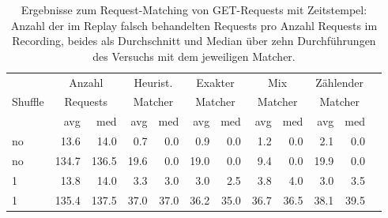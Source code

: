 \documentclass[12pt,a4paper]{report}
\begin{document}
\begin{table}[H]
	\centering
	\caption{
		Ergebnisse zum Request-Matching von GET-Requests mit Zeitstempel:
		Anzahl der im Replay falsch behandelten Requests pro Anzahl Requests im Recording,
		beides als Durchschnitt und Median über zehn Durchführungen des Versuchs mit dem jeweiligen Matcher.
	}
	\label{tab:get_ts}
	\begin{tabular}{|l|r|r|r|r|r|r|r|r|r|r|r|}
		\hline
		\multirow{3}{*}{Shuffle} & \multicolumn{2}{|c|}{Anzahl}   & \multicolumn{2}{|c|}{Heurist.} & \multicolumn{2}{|c|}{Exakter} & \multicolumn{2}{|c|}{Mix}     & \multicolumn{2}{|c|}{Zählender}                                    \\
		                         & \multicolumn{2}{|c|}{Requests} & \multicolumn{2}{|c|}{Matcher}  & \multicolumn{2}{|c|}{Matcher} & \multicolumn{2}{|c|}{Matcher} & \multicolumn{2}{|c|}{Matcher}                                      \\ \cline{2-11}
		                         & avg                            & med                            & avg                           & med                           & avg                             & med  & avg  & med  & avg  & med  \\ \hline
		no                       & 13.6                           & 14.0                           & 0.7                           & 0.0                           & 0.9                             & 0.0  & 1.2  & 0.0  & 2.1  & 0.0  \\ \hline
		no                       & 134.7                          & 136.5                          & 19.6                          & 0.0                           & 19.0                            & 0.0  & 9.4  & 0.0  & 19.9 & 0.0  \\ \hline
		1                        & 13.8                           & 14.0                           & 3.3                           & 3.0                           & 3.0                             & 2.5  & 3.8  & 4.0  & 3.0  & 3.5  \\ \hline
		1                        & 135.4                          & 137.5                          & 37.0                          & 37.0                          & 36.2                            & 35.0 & 36.7 & 36.5 & 38.1 & 39.5 \\ \hline

\end{tabular}
\end{table}
\end{document}
